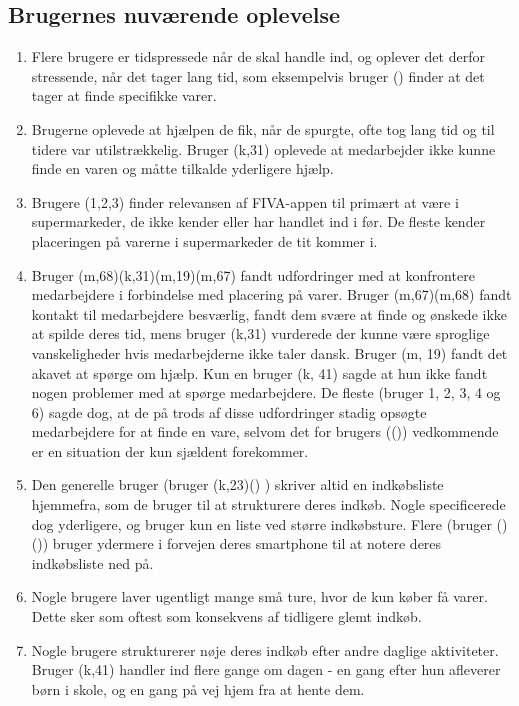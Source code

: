 \documentclass[12pt]{article}
\begin{document}
\subsection{Brugernes nuværende oplevelse}
\begin{enumerate}
\item Flere brugere er tidspressede når de skal handle ind, og oplever det derfor stressende, når det tager lang tid, som eksempelvis bruger () finder at det tager at finde specifikke varer.

\item Brugerne oplevede at hjælpen de fik, når de spurgte, ofte tog lang tid og til tidere var utilstrækkelig. Bruger (k,31) oplevede at medarbejder ikke kunne finde en varen og måtte tilkalde yderligere hjælp.

\item Brugere (1,2,3) finder relevansen af FIVA-appen til primært at være i supermarkeder, de ikke kender eller har handlet ind i før. De fleste kender placeringen på varerne i supermarkeder de tit kommer i.

\item Bruger (m,68)(k,31)(m,19)(m,67) fandt udfordringer med at konfrontere medarbejdere i forbindelse med placering på varer. Bruger (m,67)(m,68) fandt kontakt til medarbejdere besværlig, fandt dem svære at finde og ønskede ikke at spilde deres tid, mens bruger (k,31) vurderede der kunne være sproglige vanskeligheder hvis medarbejderne ikke taler dansk. Bruger (m, 19) fandt det akavet at spørge om hjælp. Kun en bruger (k, 41) sagde at hun ikke fandt nogen problemer med at spørge medarbejdere. De fleste (bruger 1, 2, 3, 4 og 6) sagde dog, at de på trods af disse udfordringer stadig opsøgte medarbejdere for at finde en vare, selvom det for brugers (()) vedkommende er en situation der kun sjældent forekommer.

\item Den generelle bruger (bruger (k,23)() ) skriver altid en indkøbsliste hjemmefra, som de bruger til at strukturere deres indkøb. Nogle specificerede dog yderligere, og bruger kun en liste ved større indkøbsture. Flere (bruger ()()) bruger ydermere i forvejen deres smartphone til at notere deres indkøbsliste ned på. 

\item Nogle brugere laver ugentligt mange små ture, hvor de kun køber få varer. Dette sker som oftest som konsekvens af tidligere glemt indkøb.

\item Nogle brugere strukturerer nøje deres indkøb efter andre daglige aktiviteter. Bruger (k,41) handler ind flere gange om dagen - en gang 
efter hun afleverer børn i skole, og en gang på vej hjem fra at hente dem.
\end{enumerate}
\end{document}
